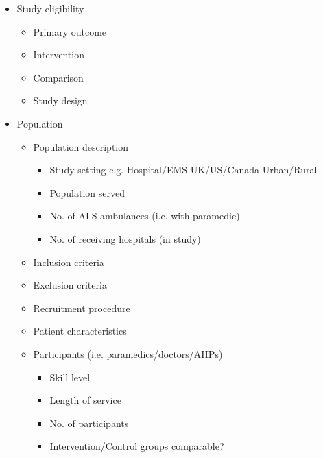 \begin{itemize}
\item Study eligibility

\begin{itemize}
\item Primary outcome

\item Intervention

\item Comparison

\item Study design

\end{itemize}

\item Population

\begin{itemize}
\item Population description

\begin{itemize}
\item Study setting e.g. Hospital\slash EMS UK\slash US\slash Canada Urban\slash Rural

\item Population served

\item No. of ALS ambulances (i.e. with paramedic)

\item No. of receiving hospitals (in study)

\end{itemize}

\item Inclusion criteria

\item Exclusion criteria

\item Recruitment procedure

\item Patient characteristics

\item Participants (i.e. paramedics\slash doctors\slash AHPs)

\begin{itemize}
\item Skill level

\item Length of service

\item No. of participants

\item Intervention\slash Control groups comparable?


\end{itemize}
\end{itemize}
\end{itemize}
